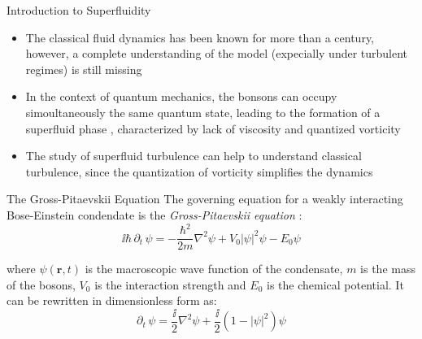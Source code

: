 \begin{frame}{Introduction to Superfluidity}
\begin{itemize}
    \item The classical fluid dynamics has been known for more than a century, however, a complete understanding of the model (expecially under turbulent regimes) is still missing \cite{frisch1995turbulence}
    \item In the context of quantum mechanics, the bonsons can occupy simoultaneously the same quantum state, leading to the formation of a superfluid phase \cite{pitaevskii2016bose}, characterized by lack of viscosity and quantized vorticity
    \item The study of superfluid turbulence can help to understand classical turbulence, since the quantization of vorticity simplifies the dynamics 
\end{itemize}
\end{frame}

\begin{frame}{The Gross-Pitaevskii Equation}
   The governing equation for a weakly interacting Bose-Einstein condendate is the \emph{Gross-Pitaevskii equation} \cite{pitaevskii2016bose}:
    \begin{equation*}
        \ii \hbar \, \partial_t \, \psi = -\frac{\hbar^2}{2m} \nabla^2 \psi  + V_0 |\psi|^2 \psi - E_0 \psi
    \end{equation*}

    where $\psi(\mathbf{r},t)$ is the macroscopic wave function of the condensate, $m$ is the mass of the bosons, $V_0$ is the interaction strength and $E_0$ is the chemical potential. It can be rewritten in dimensionless form  \cite{CZ12} as:
    \begin{equation*}
        \partial_t \, \psi = \frac{\ii}{2} \nabla^2 \psi + \frac{\ii}{2} (1 - |\psi|^2) \psi
    \end{equation*}
\end{frame}

